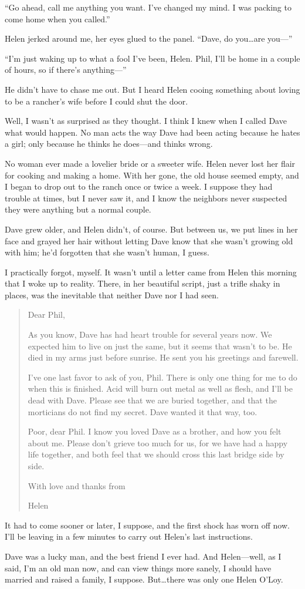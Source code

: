 \documentclass{article}
\begin{document}
“Go ahead, call me anything you want. I’ve changed my mind. I was packing to come home when you called.”

Helen jerked around me, her eyes glued to the panel. “Dave, do you…are you—”

“I’m just waking up to what a fool I’ve been, Helen. Phil, I’ll be home in a couple of hours, so if there’s anything—”

He didn’t have to chase me out. But I heard Helen cooing something about loving to be a rancher’s wife before I could shut the door.

Well, I wasn’t as surprised as they thought. I think I knew when I called Dave what would happen. No man acts the way Dave had been acting because he hates a girl; only because he thinks he does—and thinks wrong.

No woman ever made a lovelier bride or a sweeter wife. Helen never lost her flair for cooking and making a home. With her gone, the old house seemed empty, and I began to drop out to the ranch once or twice a week. I suppose they had trouble at times, but I never saw it, and I know the neighbors never suspected they were anything but a normal couple.

Dave grew older, and Helen didn’t, of course. But between us, we put lines in her face and grayed her hair without letting Dave know that she wasn’t growing old with him; he’d forgotten that she wasn’t human, I guess.

I practically forgot, myself. It wasn’t until a letter came from Helen this morning that I woke up to reality. There, in her beautiful script, just a trifle shaky in places, was the inevitable that neither Dave nor I had seen.

\begin{quote}

Dear Phil,

As you know, Dave has had heart trouble for several years now. We expected him to live on just the same, but it seems that wasn’t to be. He died in my arms just before sunrise. He sent you his greetings and farewell.

I’ve one last favor to ask of you, Phil. There is only one thing for me to do when this is finished. Acid will burn out metal as well as flesh, and I’ll be dead with Dave. Please see that we are buried together, and that the morticians do not find my secret. Dave wanted it that way, too.

Poor, dear Phil. I know you loved Dave as a brother, and how you felt about me. Please don’t grieve too much for us, for we have had a happy life together, and both feel that we should cross this last bridge side by side.

With love and thanks from

Helen

\end{quote}

It had to come sooner or later, I suppose, and the first shock has worn off now. I’ll be leaving in a few minutes to carry out Helen’s last instructions.

Dave was a lucky man, and the best friend I ever had. And Helen—well, as I said, I’m an old man now, and can view things more sanely, I should have married and raised a family, I suppose. But…there was only one Helen O’Loy.
\end{document}
